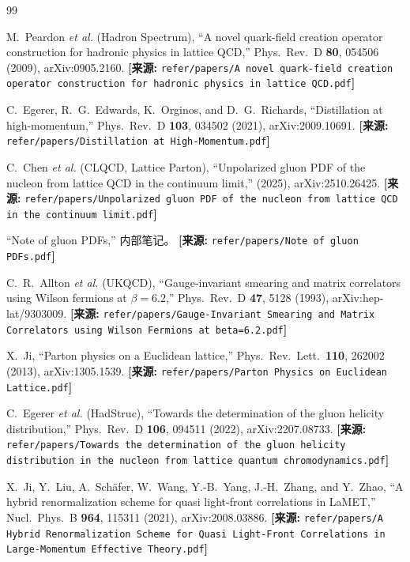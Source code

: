 \documentclass[12pt,a4paper]{ctexart}
\theoremstyle{definition}
\begin{document}
\begin{thebibliography}{99}

M.~Peardon \textit{et al.} (Hadron Spectrum),
``A novel quark-field creation operator construction for hadronic physics in lattice QCD,''
Phys.\ Rev.\ D \textbf{80}, 054506 (2009), arXiv:0905.2160.
\quad\textbf{[来源:} \texttt{refer/papers/A novel quark-field creation operator construction for hadronic physics in lattice QCD.pdf}\textbf{]}

C.~Egerer, R.~G.~Edwards, K.~Orginos, and D.~G.~Richards,
``Distillation at high-momentum,''
Phys.\ Rev.\ D \textbf{103}, 034502 (2021), arXiv:2009.10691.
\quad\textbf{[来源:} \texttt{refer/papers/Distillation at High-Momentum.pdf}\textbf{]}

C.~Chen \textit{et al.} (CLQCD, Lattice Parton),
``Unpolarized gluon PDF of the nucleon from lattice QCD in the continuum limit,''
(2025), arXiv:2510.26425.
\quad\textbf{[来源:} \texttt{refer/papers/Unpolarized gluon PDF of the nucleon from lattice QCD in the continuum limit.pdf}\textbf{]}

``Note of gluon PDFs,'' 内部笔记。
\quad\textbf{[来源:} \texttt{refer/papers/Note of gluon PDFs.pdf}\textbf{]}

C.~R.~Allton \textit{et al.} (UKQCD),
``Gauge-invariant smearing and matrix correlators using Wilson fermions at $\beta=6.2$,''
Phys.\ Rev.\ D \textbf{47}, 5128 (1993), arXiv:hep-lat/9303009.
\quad\textbf{[来源:} \texttt{refer/papers/Gauge-Invariant Smearing and Matrix Correlators using Wilson Fermions at beta=6.2.pdf}\textbf{]}

X.~Ji,
``Parton physics on a Euclidean lattice,''
Phys.\ Rev.\ Lett.\ \textbf{110}, 262002 (2013), arXiv:1305.1539.
\quad\textbf{[来源:} \texttt{refer/papers/Parton Physics on Euclidean Lattice.pdf}\textbf{]}

C.~Egerer \textit{et al.} (HadStruc),
``Towards the determination of the gluon helicity distribution,''
Phys.\ Rev.\ D \textbf{106}, 094511 (2022), arXiv:2207.08733.
\quad\textbf{[来源:} \texttt{refer/papers/Towards the determination of the gluon helicity distribution in the nucleon from lattice quantum chromodynamics.pdf}\textbf{]}

X.~Ji, Y.~Liu, A.~Sch\"afer, W.~Wang, Y.-B.~Yang, J.-H.~Zhang, and Y.~Zhao,
``A hybrid renormalization scheme for quasi light-front correlations in LaMET,''
Nucl.\ Phys.\ B \textbf{964}, 115311 (2021), arXiv:2008.03886.
\quad\textbf{[来源:} \texttt{refer/papers/A Hybrid Renormalization Scheme for Quasi Light-Front Correlations in Large-Momentum Effective Theory.pdf}\textbf{]}


\end{thebibliography}
\end{document}
